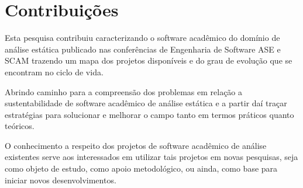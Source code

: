 




\section{Contribuições}

Esta pesquisa contribuiu caracterizando o software acadêmico do domínio de
análise estática publicado nas conferências de Engenharia de Software ASE e
SCAM trazendo um mapa dos projetos disponíveis e do grau de evolução que
se encontram no ciclo de vida.

Abrindo caminho para a compreensão dos problemas em relação a sustentabilidade de
software acadêmico de análise estática e a partir daí traçar estratégias para
solucionar e melhorar o campo tanto em termos práticos quanto teóricos.

O conhecimento a respeito dos projetos de software acadêmico de análise
existentes serve aos interessados em utilizar tais projetos em novas pesquisas,
seja como objeto de estudo, como apoio metodológico, ou ainda, como base para
iniciar novos desenvolvimentos.


